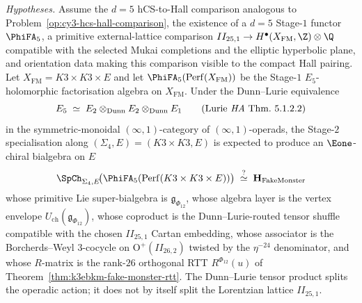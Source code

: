 \begin{conjecture}[Fake Monster chiral bialgebra at \texorpdfstring{$d = 5$}{d = 5} via Dunn--Lurie]
\label{thm:fake-monster-d5-bialgebra}
\ClaimStatusConjectured
\noindent\emph{Hypotheses.} Assume the $d = 5$ hCS-to-Hall comparison analogous to Problem~\ref{op:cy3-hcs-hall-comparison}, the existence of a $d = 5$ Stage-$1$ functor $\PhiFA_5$, a primitive external-lattice comparison \(II_{25,1}\to H^{\bullet}(X_{\mathrm{FM}},\Z)\otimes\Q\) compatible with the selected Mukai completions and the elliptic hyperbolic plane, and orientation data making this comparison visible to the compact Hall pairing.
Let $X_{\mathrm{FM}} = K3 \times K3 \times E$ and let $\PhiFA_5(\mathrm{Perf}(X_{\mathrm{FM}}))$ be the Stage-$1$ $E_5$-holomorphic factorisation algebra on $X_{\mathrm{FM}}$. Under the Dunn--Lurie equivalence
\[
 E_5 \;\simeq\; E_2 \otimes_{\mathrm{Dunn}} E_2 \otimes_{\mathrm{Dunn}} E_1
 \qquad \text{(Lurie~\textit{HA}~\textup{Thm.\ 5.1.2.2})}
\]
in the symmetric-monoidal $(\infty, 1)$-category of $(\infty, 1)$-operads, the Stage-$2$ specialisation along $(\Sigma_4, E) = (K3 \times K3, E)$ is expected to produce an $\Eone$-chiral bialgebra on $E$
\[
 \SpCh_{\Sigma_4, E}\!\bigl(\PhiFA_5(\mathrm{Perf}(K3 \times K3 \times E))\bigr)
 \;\stackrel{?}{\simeq}\;
 \mathbf{H}_{\mathrm{FakeMonster}}
\]
whose primitive Lie super-bialgebra is $\mathfrak{g}_{\Phi_{12}}$, whose algebra layer is the vertex envelope $U_{\mathrm{ch}}(\mathfrak{g}_{\Phi_{12}})$, whose coproduct is the Dunn--Lurie-routed tensor shuffle compatible with the chosen $II_{25,1}$ Cartan embedding, whose associator is the Borcherds--Weyl $3$-cocycle on $\mathrm{O}^+(II_{26, 2})$ twisted by the $\eta^{-24}$ denominator, and whose $R$-matrix is the rank-$26$ orthogonal RTT $R^{\Phi_{12}}(u)$ of Theorem~\ref{thm:k3ebkm-fake-monster-rtt}. The Dunn--Lurie tensor product splits the operadic action; it does not by itself split the Lorentzian lattice $II_{25,1}$.
\end{conjecture}


